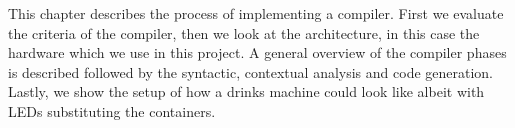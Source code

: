 This chapter describes the process of implementing a compiler. First we evaluate the criteria of the compiler, then we look at the architecture, in this case the hardware which we use in this project. A general overview of the compiler phases is described followed by the syntactic, contextual analysis and code generation. Lastly, we show the setup of how a drinks machine could look like albeit with LEDs substituting the containers.